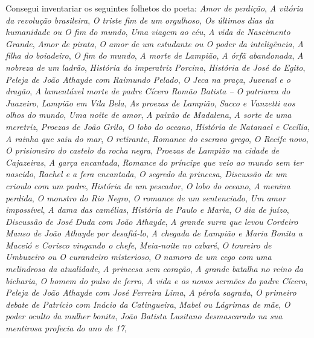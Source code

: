 Consegui inventariar os seguintes folhetos do poeta:
\textit{Amor de perdição}, \textit{A vitória da revolução brasileira}, \textit{O triste
fim de um orgulhoso}, \textit{Os últimos dias da humanidade ou O
fim do mundo}, \textit{Uma viagem ao céu}, \textit{A vida de Nascimento
Grande}, \textit{Amor de pirata}, \textit{O amor de um estudante ou O poder
da inteligência}, \textit{A filha do boiadeiro}, \textit{O fim do mundo}, \textit{A
morte de Lampião}, \textit{A órfã abandonada}, \textit{A nobreza de um
ladrão}, \textit{História da imperatriz Porcina}, \textit{História de José do
Egito}, \textit{Peleja de João Athayde com Raimundo Pelado}, \textit{O
Jeca na praça}, \textit{Juvenal e o dragão}, \textit{A lamentável morte de
padre Cícero Romão Batista -- O patriarca do Juazeiro},
\textit{Lampião em Vila Bela}, \textit{As proezas de Lampião}, \textit{Sacco e
Vanzetti aos olhos do mundo}, \textit{Uma noite de amor}, \textit{A paixão
de Madalena}, \textit{A sorte de uma meretriz}, \textit{Proezas de João
Grilo}, \textit{O lobo do oceano}, \textit{História de Natanael e Cecília}, \textit{A
rainha que saiu do mar}, \textit{O retirante}, \textit{Romance do escravo
grego}, \textit{O Recife novo}, \textit{O prisioneiro do castelo da rocha negra},
\textit{Proezas de Lampião na cidade de Cajazeiras}, \textit{A garça
encantada}, \textit{Romance do príncipe que veio ao mundo sem ter
nascido}, \textit{Rachel e a fera encantada}, \textit{O segredo da princesa},
\textit{Discussão de um crioulo com um padre}, \textit{História de um
pescador}, \textit{O lobo do oceano}, \textit{A menina perdida}, \textit{O monstro
do Rio Negro}, \textit{O romance de um sentenciado}, \textit{Um amor
impossível}, \textit{A dama das camélias}, \textit{História de Paulo e Maria},
\textit{O dia de juízo}, \textit{Discussão de José Duda com João Athayde},
\textit{A grande surra que levou Cordeiro Manso de João Athayde
por desafiá-lo}, \textit{A chegada de Lampião e Maria Bonita a
Maceió e Corisco vingando o chefe}, \textit{Meia-noite no cabaré}, \textit{O
toureiro de Umbuzeiro ou O curandeiro misterioso}, \textit{O
namoro de um cego com uma melindrosa da atualidade}, \textit{A
princesa sem coração}, \textit{A grande batalha no reino da bicharia},
\textit{O homem do pulso de ferro}, \textit{A vida e os novos sermões do
padre Cícero}, \textit{Peleja de João Athayde com José Ferreira
Lima}, \textit{A pérola sagrada}, \textit{O primeiro debate de Patrício com
Inácio da Catingueira}, \textit{Mabel ou Lágrimas de mãe}, \textit{O poder 
oculto da mulher bonita}, \textit{João Batista Lusitano
desmascarado na sua mentirosa profecia do ano de 17},
